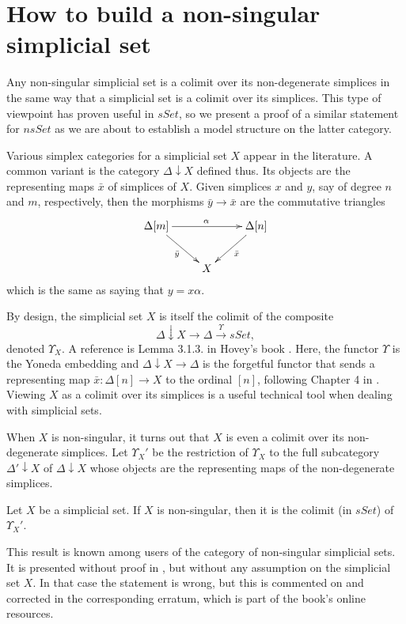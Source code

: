 

\section{How to build a non-singular simplicial set}
\label{sec:formal}

Any non-singular simplicial set is a colimit over its non-degenerate simplices in the same way that a simplicial set is a colimit over its simplices. This type of viewpoint has proven useful in $sSet$, so we present a proof of a similar statement for $nsSet$ as we are about to establish a model structure on the latter category.

Various simplex categories for a simplicial set $X$ appear in the literature. A common variant is the category $\Delta \downarrow X$ defined thus. Its objects are the representing maps $\bar{x}$ of simplices of $X$. Given simplices $x$ and $y$, say of degree $n$ and $m$, respectively, then the morphisms $\bar{y} \to \bar{x}$ are the commutative triangles
\begin{displaymath}
\xymatrix{
\Delta [m] \ar[dr]_{\bar{y} } \ar[rr]^\alpha && \Delta [n] \ar[ld]^{\bar{x} } \\
& X
}
\end{displaymath}
which is the same as saying that $y=x\alpha$.

By design, the simplicial set $X$ is itself the colimit of the composite
\[\Delta \downarrow X\to \Delta \xrightarrow{\Upsilon } sSet,\]
denoted $\Upsilon _X$. A reference is Lemma 3.1.3. in Hovey's book \cite[p.~75]{Ho99}. Here, the functor $\Upsilon$ is the Yoneda embedding and $\Delta \downarrow X\to \Delta$ is the forgetful functor that sends a representing map $\bar{x} :\Delta [n]\to X$ to the ordinal $[n]$, following Chapter 4 in \cite{FP90}. Viewing $X$ as a colimit over its simplices is a useful technical tool when dealing with simplicial sets.

When $X$ is non-singular, it turns out that $X$ is even a colimit over its non-degenerate simplices. Let $\Upsilon _X'$ be the restriction of $\Upsilon _X$ to the full subcategory $\Delta '\downarrow X$ of $\Delta \downarrow X$ whose objects are the representing maps of the non-degenerate simplices.
\begin{proposition}\label{prop:non-singular_colimit_over_non-degenerate_simplices}
Let $X$ be a simplicial set. If $X$ is non-singular, then it is the colimit (in $sSet$) of $\Upsilon _X'$.
\end{proposition}
\noindent This result is known among users of the category of non-singular simplicial sets. It is presented without proof in \cite[Lemma~3.1.4, p.~76]{Ho99}, but without any assumption on the simplicial set $X$. In that case the statement is wrong, but this is commented on and corrected in the corresponding erratum, which is part of the book's online resources.

